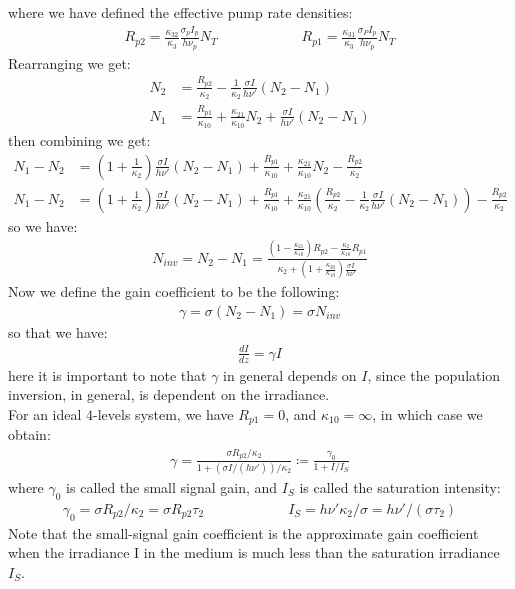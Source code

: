 \documentclass[11pt]{book}
\theoremstyle{break}
\theoremstyle{break}
\begin{document}
where we have defined the effective pump rate densities:
\begin{align*}
R_{p2} = \frac{\kappa_{32}}{\kappa_3} \frac{\sigma_p I_p}{h\nu_p}N_T\qquad\qquad\qquad R_{p1} = \frac{\kappa_{31}}{\kappa_3}\frac{\sigma_P I_p}{h\nu_p}N_T
\end{align*}
Rearranging we get:
\begin{align*}
N_2 &= \frac{R_{p2}}{\kappa_2}-\frac{1}{\kappa_2}\frac{\sigma I}{h\nu'}(N_2-N_1)\\
N_1 &= \frac{R_{p1}}{\kappa_{10}}+\frac{\kappa_{21}}{\kappa_{10}}N_2 + \frac{\sigma I}{h\nu'}(N_2-N_1) 
\end{align*}
then combining we get:
\begin{align*}
 N_1 - N_2&=\left(1+ \frac{1}{\kappa_2}\right)\frac{\sigma I}{h\nu'}(N_2 - N_1)+\frac{R_{p1}}{\kappa_{10}}+\frac{\kappa_{21}}{\kappa_{10}}N_2 -\frac{R_{p2}}{\kappa_2}\\
N_1 - N_2 &= \left(1+ \frac{1}{\kappa_2}\right)\frac{\sigma I}{h\nu'}(N_2 - N_1)+\frac{R_{p1}}{\kappa_{10}}+\frac{\kappa_{21}}{\kappa_{10}}\left( \frac{R_{p2}}{\kappa_2}-\frac{1}{\kappa_2}\frac{\sigma I}{h\nu'}(N_2-N_1)\right)-\frac{R_{p2}}{\kappa_2}
\end{align*}
so we have:
\begin{align*}
N_{inv} = N_2 - N_1 = \frac{\left(1-\frac{\kappa_{21}}{\kappa_{10}}\right) R_{p2} - \frac{\kappa_2}{\kappa_{10}}R_{p1}}{\kappa_2 +\left(1+ \frac{\kappa_{20}}{\kappa_{10}}\right) \frac{\sigma I}{h\nu'}}
\end{align*}
Now we define the gain coefficient to be the following:
\begin{align*}
\gamma = \sigma(N_2 - N_1) =\sigma N_{inv}
\end{align*}
so that we have:
\begin{align*}
\frac{dI}{dz} = \gamma I
\end{align*}
here it is important to note that $\gamma$ in general depends on $I$, since the population inversion, in general, is dependent on the irradiance. \\

For an ideal $4$-levels system, we have $R_{p1} = 0$, and $\kappa_{10} = \infty$, in which case we obtain:
\begin{align*}
\gamma=\frac{\sigma R_{p2}/\kappa_2}{1+(\sigma I/(h\nu'))/\kappa_2} \coloneqq \frac{\gamma_0 }{1 + I/I_S}
\end{align*}
where $\gamma_0$ is called the small signal gain, and $I_S$ is called the saturation intensity:
\begin{align*}
\gamma_0 = \sigma R_{p2}/\kappa_2 = \sigma R_{p2} \tau_2 \qquad\qquad\qquad I_S = h\nu'\kappa_2 /\sigma = h\nu' /(\sigma\tau_2)
\end{align*}
Note that the small-signal gain coefficient is the approximate gain coefficient when the irradiance I in the medium is much less than the saturation irradiance $I_S$.\\
\end{document}
